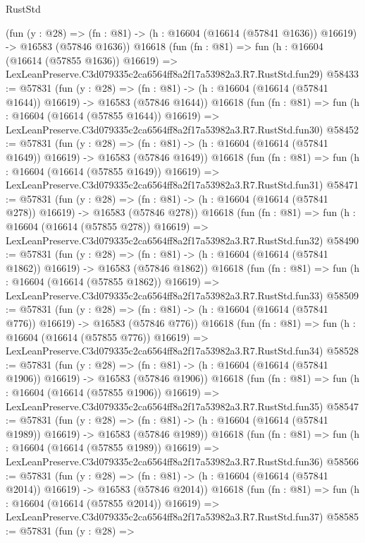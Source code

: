 \begin{lexlean}{RustStd}
\begin{coremodule}
    (fun (y : @28) =>
    (fn : @81) -> (h : @16604 (@16614 (@57841 @1636)) @16619) -> @16583 (@57846 @1636))
    @16618
    (fun (fn : @81) =>
    fun (h : @16604 (@16614 (@57855 @1636)) @16619) =>
    LexLeanPreserve.C3d079335c2ca6564ff8a2f17a53982a3.R7.RustStd.fun29)
@58433 := @57831
    (fun (y : @28) =>
    (fn : @81) -> (h : @16604 (@16614 (@57841 @1644)) @16619) -> @16583 (@57846 @1644))
    @16618
    (fun (fn : @81) =>
    fun (h : @16604 (@16614 (@57855 @1644)) @16619) =>
    LexLeanPreserve.C3d079335c2ca6564ff8a2f17a53982a3.R7.RustStd.fun30)
@58452 := @57831
    (fun (y : @28) =>
    (fn : @81) -> (h : @16604 (@16614 (@57841 @1649)) @16619) -> @16583 (@57846 @1649))
    @16618
    (fun (fn : @81) =>
    fun (h : @16604 (@16614 (@57855 @1649)) @16619) =>
    LexLeanPreserve.C3d079335c2ca6564ff8a2f17a53982a3.R7.RustStd.fun31)
@58471 := @57831
    (fun (y : @28) =>
    (fn : @81) -> (h : @16604 (@16614 (@57841 @278)) @16619) -> @16583 (@57846 @278))
    @16618
    (fun (fn : @81) =>
    fun (h : @16604 (@16614 (@57855 @278)) @16619) =>
    LexLeanPreserve.C3d079335c2ca6564ff8a2f17a53982a3.R7.RustStd.fun32)
@58490 := @57831
    (fun (y : @28) =>
    (fn : @81) -> (h : @16604 (@16614 (@57841 @1862)) @16619) -> @16583 (@57846 @1862))
    @16618
    (fun (fn : @81) =>
    fun (h : @16604 (@16614 (@57855 @1862)) @16619) =>
    LexLeanPreserve.C3d079335c2ca6564ff8a2f17a53982a3.R7.RustStd.fun33)
@58509 := @57831
    (fun (y : @28) =>
    (fn : @81) -> (h : @16604 (@16614 (@57841 @776)) @16619) -> @16583 (@57846 @776))
    @16618
    (fun (fn : @81) =>
    fun (h : @16604 (@16614 (@57855 @776)) @16619) =>
    LexLeanPreserve.C3d079335c2ca6564ff8a2f17a53982a3.R7.RustStd.fun34)
@58528 := @57831
    (fun (y : @28) =>
    (fn : @81) -> (h : @16604 (@16614 (@57841 @1906)) @16619) -> @16583 (@57846 @1906))
    @16618
    (fun (fn : @81) =>
    fun (h : @16604 (@16614 (@57855 @1906)) @16619) =>
    LexLeanPreserve.C3d079335c2ca6564ff8a2f17a53982a3.R7.RustStd.fun35)
@58547 := @57831
    (fun (y : @28) =>
    (fn : @81) -> (h : @16604 (@16614 (@57841 @1989)) @16619) -> @16583 (@57846 @1989))
    @16618
    (fun (fn : @81) =>
    fun (h : @16604 (@16614 (@57855 @1989)) @16619) =>
    LexLeanPreserve.C3d079335c2ca6564ff8a2f17a53982a3.R7.RustStd.fun36)
@58566 := @57831
    (fun (y : @28) =>
    (fn : @81) -> (h : @16604 (@16614 (@57841 @2014)) @16619) -> @16583 (@57846 @2014))
    @16618
    (fun (fn : @81) =>
    fun (h : @16604 (@16614 (@57855 @2014)) @16619) =>
    LexLeanPreserve.C3d079335c2ca6564ff8a2f17a53982a3.R7.RustStd.fun37)
@58585 := @57831
    (fun (y : @28) =>

\end{coremodule}
\end{lexlean}
